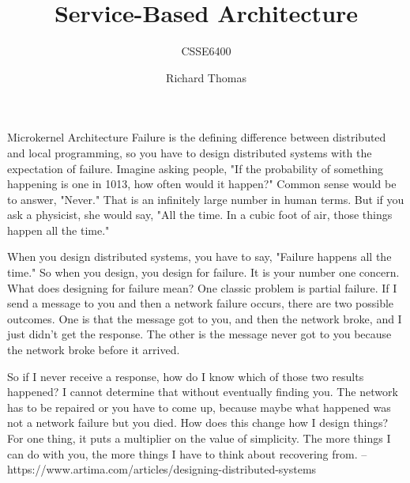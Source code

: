 \documentclass{slide}
\title{Service-Based Architecture}
\subtitle{CSSE6400}
\author{Richard Thomas}
\date{\week{4}}
\begin{document}
\maketitle



\begin{frame}{Microkernel Architecture}
Failure is the defining difference between distributed and local programming, so you have to design distributed systems with the expectation of failure. Imagine asking people, "If the probability of something happening is one in 1013, how often would it happen?" Common sense would be to answer, "Never." That is an infinitely large number in human terms. But if you ask a physicist, she would say, "All the time. In a cubic foot of air, those things happen all the time."

When you design distributed systems, you have to say, "Failure happens all the time." So when you design, you design for failure. It is your number one concern. What does designing for failure mean? One classic problem is partial failure. If I send a message to you and then a network failure occurs, there are two possible outcomes. One is that the message got to you, and then the network broke, and I just didn't get the response. The other is the message never got to you because the network broke before it arrived.

So if I never receive a response, how do I know which of those two results happened? I cannot determine that without eventually finding you. The network has to be repaired or you have to come up, because maybe what happened was not a network failure but you died. How does this change how I design things? For one thing, it puts a multiplier on the value of simplicity. The more things I can do with you, the more things I have to think about recovering from.
 -- https://www.artima.com/articles/designing-distributed-systems
\end{frame}
\end{document}
